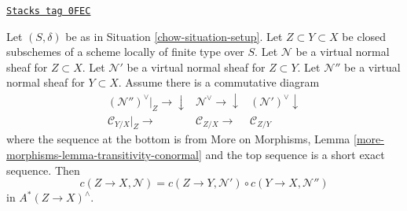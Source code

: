 \begin{lemma}
\label{chow-lemma-gysin-composition}
\href{https://stacks.math.columbia.edu/tag/0FEC}{\texttt{Stacks tag 0FEC}}

Let $(S, \delta)$ be as in Situation \ref{chow-situation-setup}.
Let $Z \subset Y \subset X$ be closed subschemes of a scheme locally
of finite type over $S$.
Let $\mathcal{N}$ be a virtual normal sheaf for $Z \subset X$.
Let $\mathcal{N}'$ be a virtual normal sheaf for $Z \subset Y$.
Let $\mathcal{N}''$ be a virtual normal sheaf for $Y \subset X$.
Assume there is a commutative diagram
$$
\begin{array}{ccc}(\mathcal{N}'')^\vee|_Z \longrightarrow\downarrow & \mathcal{N}^\vee \longrightarrow\downarrow & (\mathcal{N}')^\vee \downarrow \\ \mathcal{C}_{Y/X}|_Z \longrightarrow & \mathcal{C}_{Z/X} \longrightarrow & \mathcal{C}_{Z/Y}\end{array}
$$
where the sequence at the bottom is from More on Morphisms, Lemma
\ref{more-morphisms-lemma-transitivity-conormal} and the top
sequence is a short exact sequence. Then
$$
c(Z \to X, \mathcal{N}) =
c(Z \to Y, \mathcal{N}') \circ c(Y \to X, \mathcal{N}'')
$$
in $A^*(Z \to X)^\wedge$.
\end{lemma}

